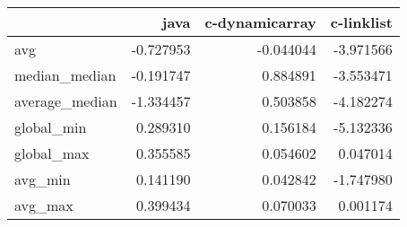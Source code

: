 \begin{tabular}{lrrr}
\toprule
{} &      java &  c-dynamicarray &  c-linklist \\
\midrule
avg            & -0.727953 &       -0.044044 &   -3.971566 \\
median\_median  & -0.191747 &        0.884891 &   -3.553471 \\
average\_median & -1.334457 &        0.503858 &   -4.182274 \\
global\_min     &  0.289310 &        0.156184 &   -5.132336 \\
global\_max     &  0.355585 &        0.054602 &    0.047014 \\
avg\_min        &  0.141190 &        0.042842 &   -1.747980 \\
avg\_max        &  0.399434 &        0.070033 &    0.001174 \\
\bottomrule
\end{tabular}
